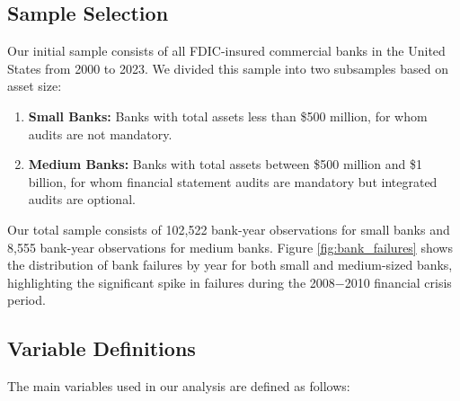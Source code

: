 \documentclass[12pt]{article}
\begin{document}
\subsection{Sample Selection}

Our initial sample consists of all FDIC-insured commercial banks in the United States from 2000 to 2023. We divided this sample into two subsamples based on asset size:

\begin{enumerate}
    \item \textbf{Small Banks:} Banks with total assets less than \$500 million, for whom audits are not mandatory.
    
    \item \textbf{Medium Banks:} Banks with total assets between \$500 million and \$1 billion, for whom financial statement audits are mandatory but integrated audits are optional.
\end{enumerate}

Our total sample consists of 102,522 bank-year observations for small banks and 8,555 bank-year observations for medium banks. Figure \ref{fig:bank_failures} shows the distribution of bank failures by year for both small and medium-sized banks, highlighting the significant spike in failures during the 2008$-$2010 financial crisis period.

\subsection{Variable Definitions}

The main variables used in our analysis are defined as follows:
\end{document}
